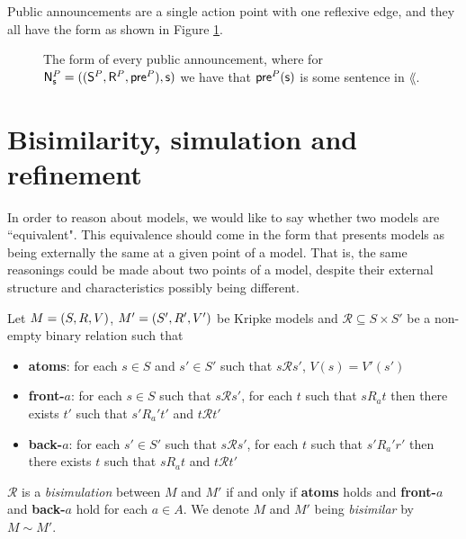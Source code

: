 Public announcements are a single action point with one reflexive edge, and they all have the form
as shown in Figure \ref{figure:exampleAnnounce}.

\begin{figure}
\centering
{}
\caption[Public announcement form]{The form of every public announcement, where for $\mathrm{\mathsf{N}}^P_\mathrm{\mathsf{s}} =
((\mathrm{\mathsf{S}}^P,\mathrm{\mathsf{R}}^P,\mathrm{\mathsf{pre}}^P),\mathrm{\mathsf{s}})$ we have that $\mathrm{\mathsf{pre}}^P(\mathrm{\mathsf{s}})$ is some sentence in $\lang$.}
\label{figure:exampleAnnounce}
\end{figure}

\section{Bisimilarity, simulation and refinement} \label{subsec:prelim:bisimulation}

In order to reason about models, we would like to say whether two models are ``equivalent".
This equivalence should come in the form that presents models as being externally the same at a
given point of a model.
That is, the same reasonings could be made about two points of a model, despite their external
structure and characteristics possibly being different.

\begin{defn} \label{bisimKripke}
	Let $M = (S,R,V)$, $M' = (S',R',V')$ be Kripke models and $\mathcal{R} \subseteq S \times S'$ be a non-empty binary
	relation such that
	\begin{itemize}
		\item {\bf atoms}: for each $s \in S$ and $s' \in S'$ such that $s \mathcal{R} s'$, $V(s) = V'(s')$
		\item {\bf front-$a$}: for each $s \in S$ such that $s \mathcal{R} s'$, for each $t$ such that
		$s R_a t$ then there exists $t'$ such that $s' R_a' t'$ and $t \mathcal{R} t'$
		\item {\bf back-$a$}: for each $s' \in S'$ such that $s \mathcal{R} s'$, for each $t$ such that
		$s' R_a' r'$ then there exists $t$ such that $s R_a t$ and $t \mathcal{R} t'$
	\end{itemize}
	$\mathcal{R}$ is a {\em bisimulation} between $M$ and $M'$ if and only if {\bf atoms} holds and {\bf front-$a$}
	and {\bf back-$a$} hold for each $a \in A$.
	We denote $M$ and $M'$ being {\em bisimilar} by $M \sim M'$.
\end{defn}

